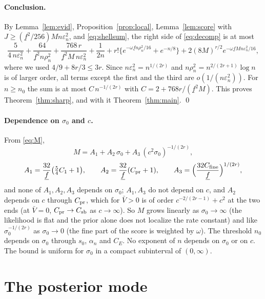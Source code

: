 \documentclass[11pt]{article}
\theoremstyle{definition}
\theoremstyle{remark}
\newcommand{\om}{\omega}
\newcommand{\en}{\varepsilon_n}
\newcommand{\fl}{\underline f}
\newcommand{\Vb}{\bar V}
\begin{document}
\paragraph{Conclusion.} By Lemma~\ref{lem:evid}, Proposition~\ref{prop:local}, Lemma~\ref{lem:score} with $J\ge(\fl^2/256)Mn\en^2$, and \eqref{eq:shellsum}, the right side of \eqref{eq:decomp} is at most
\[
\frac{5}{4\,n\en^2}+\frac{64}{\fl^2n\rho_n^2}+\frac{768\,r}{\fl^2M\,n\en^2}+\frac1{2n}+r!\bigl\{e^{-\om\fl n\rho_n^2/16}+e^{-n/8}\bigr\}+2(8M)^{r/2}e^{-\om\fl Mn\en^2/16},
\]
where we used $4/9+8r/3\le3r$. Since $n\en^2=n^{1/(2r)}$ and $n\rho_n^2=n^{2/(2r+1)}\log n$ is of larger order, all terms except the first and the third are $o(1/(n\en^2))$. For $n\ge n_0$ the sum is at most $C\,n^{-1/(2r)}$ with $C=2+768r/(\fl^2M)$. This proves Theorem~\ref{thm:sharp}, and with it Theorem~\ref{thm:main}. \qed

\paragraph{Dependence on $\sigma_0$ and $c$.} From \eqref{eq:M},
\[
M=A_1+A_2\,\sigma_0+A_3\,(c^2\sigma_0)^{-1/(2r)},
\]
\[
A_1=\frac{32}{\fl}\bigl(\tfrac54C_1+1\bigr),\qquad A_2=\frac{32}{\fl}(C_{\rm pr}+1),\qquad A_3=\Bigl(\frac{32C_{\rm fine}}{\fl}\Bigr)^{1/(2r)},
\]
and none of $A_1,A_2,A_3$ depends on $\sigma_0$; $A_1,A_3$ do not depend on $c$, and $A_2$ depends on $c$ through $C_{\rm pr}$, which for $\Vb>0$ is of order $c^{-2/(2r-1)}+c^2$ at the two ends (at $\Vb=0$, $C_{\rm pr}\to C_{\rm sb}$ as $c\to\infty$). So $M$ grows linearly as $\sigma_0\to\infty$ (the likelihood is flat and the prior alone does not localize the rate constant) and like $\sigma_0^{-1/(2r)}$ as $\sigma_0\to0$ (the fine part of the score is weighted by $\om$). The threshold $n_0$ depends on $\sigma_0$ through $s_0$, $\alpha_n$ and $C_E$. No exponent of $n$ depends on $\sigma_0$ or on $c$. The bound is uniform for $\sigma_0$ in a compact subinterval of $(0,\infty)$.

\section{The posterior mode}\label{sec:mode}
\end{document}
